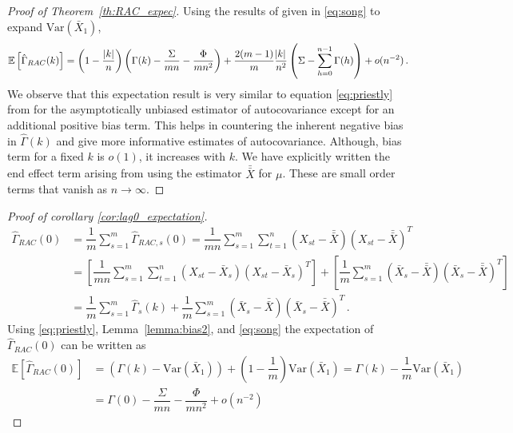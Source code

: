 \documentclass[11pt]{article}
\newcommand{\Var}{\text{Var}}
\theoremstyle{remark}
\begin{document}
\begin{proof}[Proof of Theorem~\ref{th:RAC_expec}]
Using the results of \cite{song1995optimal} given in \eqref{eq:song} to expand $\Var(\bar{X}_1)$,
\[
\mathbb{E}\left[\hat{\Gamma}_{RAC}(k)\right] = \left(1- \dfrac{|k|}{n}\right)\left(\Gamma(k) - \dfrac{\Sigma}{mn} - \dfrac{\Phi}{mn^2}\right)  + \dfrac{2(m-1)}{m}\dfrac{\abs{k}}{n^2} \left(\Sigma - \sum_{h=0}^{n-1}\Gamma(h)\right) + o(n^{-2})\,.
\]
%
We observe that this expectation result is very similar to equation \ref{eq:priestly} from \cite{priestley1981spectral} for the asymptotically unbiased estimator of autocovariance except for an additional positive bias term. This helps in countering the inherent negative bias in $\hat{\Gamma}(k)$ and give more informative estimates of autocovariance.  Although, bias term for a fixed $k$ is $o(1)$, it increases with $k$. We have explicitly written the end effect term arising from using the estimator $\bar{\bar{X}}$ for $\mu$. These are small order terms that vanish as $n \to \infty$.
\end{proof}

\begin{proof}[Proof of corollary \ref{cor:lag0_expectation}]

\begin{align*}
    \hat{\Gamma}_{RAC}(0) &= \dfrac{1}{m}\sum_{s=1}^{m}\hat{\Gamma}_{RAC,s}(0) = \dfrac{1}{mn}\sum_{s=1}^{m}\sum_{t=1}^{n}  \left(X_{st} - \bar{\bar{X}}\right)  \left(X_{st} - \bar{\bar{X}}\right)^T\\
    &= \left[\dfrac{1}{mn}\sum_{s=1}^{m}\sum_{t=1}^{n} \left(X_{st} - \bar{X}_s \right)  \left(X_{st} - \bar{X}_s \right)^T\right] + \left[\dfrac{1}{m}\sum_{s=1}^{m} \left(\bar{X}_s - \bar{\bar{X}} \right) \left(\bar{X}_s - \bar{\bar{X}} \right)^T\right]\\
    &= \dfrac{1}{m}\sum_{s=1}^{m}\hat{\Gamma}_s(k)  + \dfrac{1}{m}\sum_{s=1}^{m} \left(\bar{X}_s - \bar{\bar{X}} \right)  \left(\bar{X}_s - \bar{\bar{X}} \right)^T\,.
\end{align*}
Using \eqref{eq:priestly}, Lemma~\ref{lemma:bias2}, and \eqref{eq:song} the expectation of $\hat{\Gamma}_{RAC}(0)$ can be written as 
%
\begin{align*}
    \mathbb{E} \left[\hat{\Gamma}_{RAC}(0) \right] &= \left(\Gamma(k) - \Var(\bar{X}_1)\right) + \left(1-\dfrac{1}{m}\right)\Var(\bar{X}_1) = \Gamma(k) - \dfrac{1}{m}\Var(\bar{X}_1)\\
    &= \Gamma(0) - \dfrac{\Sigma}{mn} - \dfrac{\Phi}{mn^2} + o(n^{-2})
\end{align*}

\end{proof}
\end{document}
